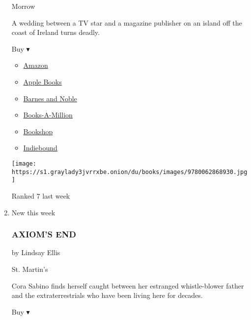 \begin{enumerate}
  Morrow

  A wedding between a TV star and a magazine publisher on an island off
  the coast of Ireland turns deadly.

  Buy ▾

  \begin{itemize}
  \tightlist
  \item
    \href{https://www.amazon.com/dp/0062868934?tag=NYTBSREV-20\&tag=NYTBS-20}{Amazon}
  \item
    \href{https://du-gae-books-dot-nyt-du-prd.appspot.com/buy?title=THE+GUEST+LIST\&author=Lucy+Foley}{Apple
    Books}
  \item
    \href{https://www.anrdoezrs.net/click-7990613-11819508?url=https\%3A\%2F\%2Fwww.barnesandnoble.com\%2Fw\%2F\%3Fean\%3D9780062868930}{Barnes
    and Noble}
  \item
    \href{https://www.anrdoezrs.net/click-7990613-35140?url=https\%3A\%2F\%2Fwww.booksamillion.com\%2Fp\%2FTHE\%2BGUEST\%2BLIST\%2FLucy\%2BFoley\%2F9780062868930}{Books-A-Million}
  \item
    \href{https://bookshop.org/a/3546/9780062868930}{Bookshop}
  \item
    \href{https://www.indiebound.org/book/9780062868930?aff=NYT}{Indiebound}
  \end{itemize}

  \texttt{[image: https://s1.graylady3jvrrxbe.onion/du/books/images/9780062868930.jpg]}

  Ranked 7 last week
\item
  New this week

  \hypertarget{axioms-end}{%
  \subsubsection{AXIOM'S END}\label{axioms-end}}

  by Lindsay Ellis

  St. Martin's

  Cora Sabino finds herself caught between her estranged whistle-blower
  father and the extraterrestrials who have been living here for
  decades.

  Buy ▾


\end{enumerate}
